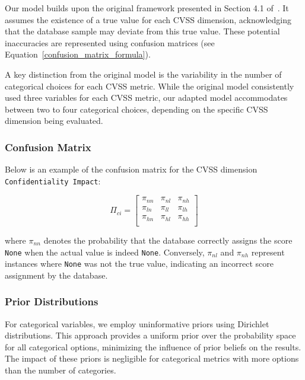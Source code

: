 \documentclass[12pt]{article}
\begin{document}
Our model builds upon the original framework presented in Section 4.1 of~\cite{bayes}. It assumes
the existence of a true value for each CVSS dimension, acknowledging that the database sample may
deviate from this true value. These potential inaccuracies are represented using confusion matrices
(see Equation~\ref{confusion_matrix_formula}).

A key distinction from the original model is the variability in the number of categorical choices
for each CVSS metric. While the original model consistently used three variables for each CVSS
metric, our adapted model accommodates between two to four categorical choices, depending on the
specific CVSS dimension being evaluated.

\subsubsection{Confusion Matrix}

Below is an example of the confusion matrix for the CVSS dimension \texttt{Confidentiality Impact}:

\begin{equation}\label{confusion_matrix_formula}
	\Pi_{ci} = \begin{bmatrix}
		\pi_{nn} & \pi_{nl} & \pi_{nh} \\
		\pi_{ln} & \pi_{ll} & \pi_{lh} \\
		\pi_{hn} & \pi_{hl} & \pi_{hh} \\
	\end{bmatrix}
\end{equation}

where $\pi_{nn}$ denotes the probability that the database correctly assigns the score \texttt{None}
when the actual value is indeed \texttt{None}. Conversely, $\pi_{nl}$ and $\pi_{nh}$ represent
instances where \texttt{None} was not the true value, indicating an incorrect score assignment by
the database.

\subsubsection{Prior Distributions}

For categorical variables, we employ uninformative priors using Dirichlet distributions. This
approach provides a uniform prior over the probability space for all categorical options, minimizing
the influence of prior beliefs on the results. The impact of these priors is negligible for
categorical metrics with more options than the number of categories.
\end{document}
